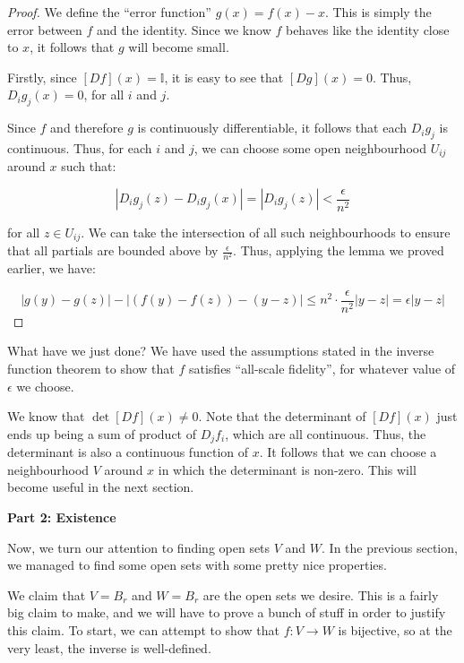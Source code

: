 \documentclass[10pt, oneside]{amsart}
\begin{document}
    \begin{proof}
      We define the ``error function'' $g(x) = f(x) - x$. This is simply the error between $f$ and the identity. Since we know $f$ behaves like the identity close to $x$, it follows that
      $g$ will become small.
      \newline

      Firstly, since $[D f](x) = \mathbb{I}$, it is easy to see that $[D g](x) = 0$. Thus, $D_i g_j(x) = 0$, for all $i$ and $j$.
      \newline

      Since $f$ and therefore $g$ is continuously differentiable, it follows that each $D_i g_j$ is continuous. Thus, for each $i$ and $j$, we can choose some open neighbourhood $U_{ij}$ around $x$
      such that:

      $$|D_i g_j(z) - D_i g_j(x)| = |D_i g_j(z)| < \frac{\epsilon}{n^2}$$

      for all $z \in U_{ij}$. We can take the intersection of all such neighbourhoods to ensure that all partials are bounded above by $\frac{\epsilon}{n^2}$. Thus, applying the lemma we proved earlier,
      we have:

      $$|g(y) - g(z)| - | (f(y) - f(z)) - (y - z) | \leq n^2 \cdot \frac{\epsilon}{n^2} |y - z| = \epsilon | y - z|$$
    \end{proof}

    What have we just done? We have used the assumptions stated in the inverse function theorem to show that $f$ satisfies ``all-scale fidelity'', for whatever value of $\epsilon$ we choose.
    \newline

    We know that $\det [Df](x) \neq 0$. Note that the determinant of $[Df](x)$ just ends up being a sum of product of $D_j f_i$, which are all continuous. Thus, the determinant is also a continuous function
    of $x$. It follows that we can choose a neighbourhood $V$ around $x$ in which the determinant is non-zero. This will become useful in the next section.
    \newline

    \textbf{Part 2: Existence}
    \newline

    Now, we turn our attention to finding open sets $V$ and $W$. In the previous section, we managed to find some open sets with some pretty nice properties.
    \newline

    We claim that $V = B_r$ and $W = B_r$ are the open sets we desire. This is a fairly big claim to make, and we will have to prove a bunch of stuff in order to justify this claim. To start, we
    can attempt to show that $f : V \rightarrow W$ is bijective, so at the very least, the inverse is well-defined.
    \newline
\end{document}
